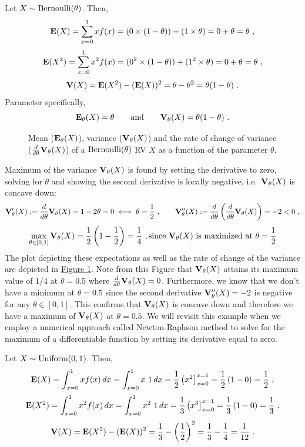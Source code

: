 \begin{example}\label{EgMeanAndVarOfBernoulli}
Let $X \sim \mbox{{\rm Bernoulli}}(\theta)$.  Then, 
\[
\mathbf{E}(X) = \sum_{x=0}^1 x f(x) = (0 \times (1-\theta)) + (1 \times \theta) = 0+\theta=\theta \ ,
\]
\[
\mathbf{E}(X^2) =  \sum_{x=0}^1 x^2 f(x) =  (0^2 \times (1-\theta) ) + (1^2 \times \theta) = 0+\theta= \theta \ ,
\]
\[
\mathbf{V}(X) = \mathbf{E}(X^2) - (\mathbf{E}(X))^2 = \theta - \theta^2 = \theta(1-\theta) \ .
\]
Parameter specifically,
\[
\mathbf{E}_{\theta}(X)=\theta \qquad \text{and} \qquad \mathbf{V}_{\theta}(X)=\theta(1-\theta) \ .
\]
\begin{figure}[htpb]
\caption{Mean ($\mathbf{E}_{\theta}(X)$), variance ($\mathbf{V}_{\theta}(X)$) and the rate of change of variance ($\frac{d}{d \theta} \mathbf{V}_{\theta}(X)$) of a $\mbox{{\rm Bernoulli}}(\theta)$ RV $X$ as a function of the parameter $\theta$.\label{F:MeanVarBernoulli}}
\centering   {}
\end{figure}

Maximum of the variance $\mathbf{V}_{\theta}(X)$ is found by setting the derivative to zero, solving for $\theta$ and showing the second derivative is locally negative, i.e.~$\mathbf{V}_{\theta}(X)$ is concave down:
\[
\mathbf{V}_{\theta}'(X) := \frac{d}{d \theta} \mathbf{V}_{\theta}(X) = 1-2 \theta = 0  \iff \theta = \frac{1}{2} \ , 
\qquad \mathbf{V}_{\theta}''(X) := \frac{d}{d \theta} \left( \frac{d}{d \theta} \mathbf{V}_{\theta}(X) \right) = -2 < 0 \ ,
\]
\[
\max_{\theta \in [0,1]} \mathbf{V}_{\theta}(X) = \frac{1}{2} \left(1-\frac{1}{2} \right) = \frac{1}{4} \ , 
\text{since $\mathbf{V}_{\theta}(X)$ is maximized at $\theta = \frac{1}{2}$}
\]
The plot depicting these expectations as well as the rate of change of the variance are depicted in \hyperref[F:MeanVarBernoulli]{Figure \ref*{F:MeanVarBernoulli}}.  Note from this Figure that $\mathbf{V}_{\theta}(X)$ attains its maximum  value of $1/4$ at $\theta=0.5$ where $\frac{d}{d\theta}\mathbf{V}_{\theta}(X)=0$.  Furthermore, we know that we don't have a minimum at $\theta=0.5$ since the second derivative $\mathbf{V}_{\theta}''(X) = -2$ is negative for any $\theta \in [0,1]$.  This confirms that $\mathbf{V}_{\theta}(X)$ is concave down and therefore we have a maximum of $\mathbf{V}_{\theta}(X)$ at $\theta=0.5$.  We will revisit this example when we employ a numerical approach called Newton-Raphson method to solve for the maximum of a differentiable function by setting its derivative equal to zero.
\end{example}

\begin{example}\label{EgMeanAndVarOfUnif01}
Let $X \sim \mbox{{\rm Uniform}}(0,1)$.  Then, 
\[
\mathbf{E}(X) = \int_{x=0}^1 x f(x)\, dx = \int_{x=0}^1 x \ 1 \, dx = \frac{1}{2} \left( x^2 \right]_{x=0}^{x=1} = \frac{1}{2} \left( 1-0 \right) = \frac{1}{2} \ ,
\]
\[
\mathbf{E}(X^2) = \int_{x=0}^1 x^2 f(x)\, dx = \int_{x=0}^1 x^2 \ 1 \, dx =  \frac{1}{3} \left( x^3 \right]_{x=0}^{x=1} = \frac{1}{3} \left( 1-0 \right) = \frac{1}{3} \ ,
\]
\[
\mathbf{V}(X) = \mathbf{E}(X^2) - (\mathbf{E}(X))^2 = \frac{1}{3}  - \left( \frac{1}{2} \right)^2  = \frac{1}{3}  - \frac{1}{4} = \frac{1}{12} \ .
\]
\end{example}

